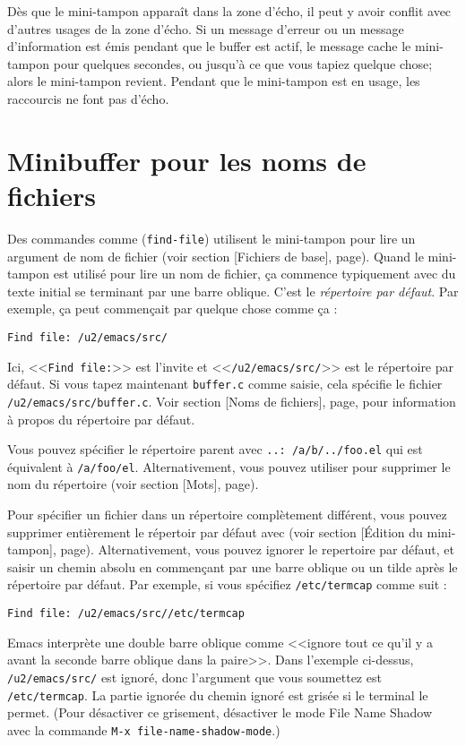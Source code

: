 Dès que le mini-tampon apparaît dans la zone d'écho, il peut y avoir
conflit avec d'autres usages de la zone d'écho. Si un message d'erreur
ou un message d'information est émis pendant que le buffer est actif,
le message cache le mini-tampon pour quelques secondes, ou jusqu'à ce
que vous tapiez quelque chose; alors le mini-tampon revient. Pendant
que le mini-tampon est en usage, les raccourcis ne font pas d'écho.\par  

\section{Minibuffer pour les noms de fichiers}

Des commandes comme  (\texttt{find-file}) utilisent le
mini-tampon pour lire un argument de nom de fichier (voir
section [Fichiers de base], page). Quand le
mini-tampon est utilisé pour lire un nom de fichier, \c{c}a commence
typiquement avec du texte initial se terminant par une barre
oblique. C'est le \emph{répertoire par défaut}. Par exemple, \c{c}a
peut commençait par quelque chose comme \c{c}a :
\begin{center}
  \texttt{Find file: /u2/emacs/src/}
\end{center}
Ici, <<\texttt{Find file:}>> est l'invite et
<<\texttt{/u2/emacs/src/}>> est le répertoire par défaut. Si vous
tapez maintenant \texttt{buffer.c} comme saisie, cela spécifie le
fichier \texttt{/u2/emacs/src/buffer.c}. Voir section
[Noms de fichiers], page, pour information à propos du
répertoire par défaut.\par

Vous pouvez spécifier le répertoire parent avec \texttt{..:
  /a/b/../foo.el} qui est équivalent à
\texttt{/a/foo/el}. Alternativement, vous pouvez utiliser
 pour supprimer le nom du répertoire (voir
section [Mots], page).\par

Pour spécifier un fichier dans un répertoire complètement différent,
vous pouvez supprimer entièrement le répertoir par défaut avec
 (voir section [\'Edition du mini-tampon],
page). Alternativement, vous pouvez ignorer le repertoire
par défaut, et saisir un chemin absolu en commençant par une barre
oblique ou un tilde après le répertoire par défaut. Par exemple, si
vous spécifiez \texttt{/etc/termcap} comme suit :
\begin{center}
  \texttt{Find file: /u2/emacs/src//etc/termcap}
\end{center}
Emacs interprète une double barre oblique comme <<ignore tout ce qu'il
y a avant la seconde barre oblique dans la paire>>. Dans l'exemple
ci-dessus, \texttt{/u2/emacs/src/} est ignoré, donc l'argument que
vous soumettez est \texttt{/etc/termcap}. La partie ignorée du chemin
ignoré est grisée si le terminal le permet. (Pour désactiver ce
grisement, désactiver le mode File Name Shadow avec la commande
\texttt{M-x file-name-shadow-mode}.)\par

